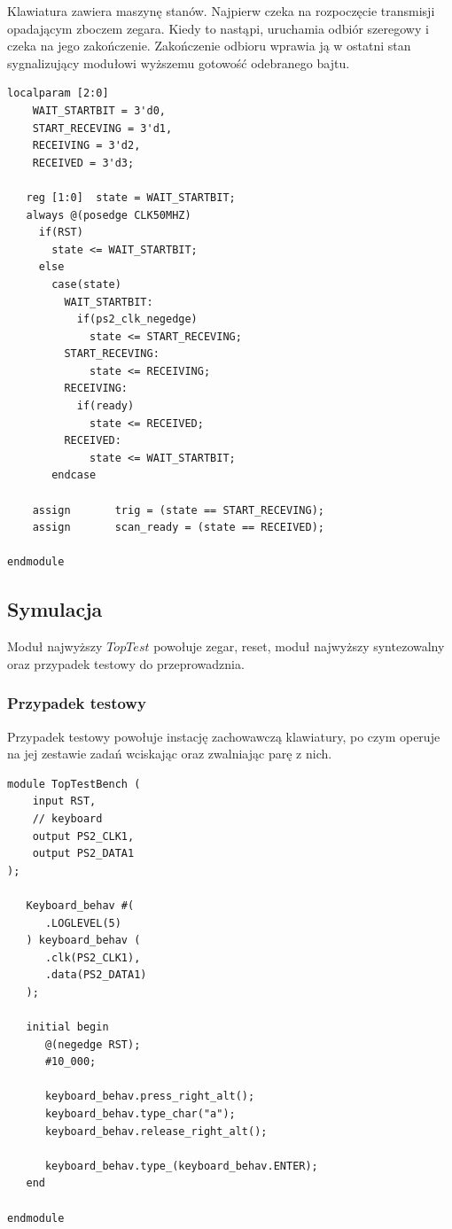\documentclass[a4paper,12pt]{article}
\begin{document}
Klawiatura zawiera maszynę stanów. Najpierw czeka na rozpoczęcie transmisji opadającym zboczem zegara. Kiedy to nastąpi, uruchamia odbiór szeregowy i czeka na jego zakończenie. Zakończenie odbioru wprawia ją w ostatni stan sygnalizujący modułowi wyższemu gotowość odebranego bajtu.
\begin{lstlisting}[label=Keyboard,caption=Keyboard.v,firstnumber=42]
   localparam [2:0]
    WAIT_STARTBIT = 3'd0,
    START_RECEVING = 3'd1,
    RECEIVING = 3'd2,
    RECEIVED = 3'd3;

   reg [1:0]  state = WAIT_STARTBIT;
   always @(posedge CLK50MHZ)
     if(RST)
       state <= WAIT_STARTBIT;
     else
       case(state)
         WAIT_STARTBIT:
           if(ps2_clk_negedge)
             state <= START_RECEVING;
         START_RECEVING:
             state <= RECEIVING;
         RECEIVING:
           if(ready)
             state <= RECEIVED;
         RECEIVED:
             state <= WAIT_STARTBIT;
       endcase

    assign       trig = (state == START_RECEVING);
    assign       scan_ready = (state == RECEIVED);

endmodule
\end{lstlisting}


\subsection{Symulacja}

Moduł najwyższy $TopTest$ powołuje zegar, reset, moduł najwyższy syntezowalny oraz przypadek testowy do przeprowadznia.

\subsubsection{Przypadek testowy}

Przypadek testowy powołuje instację zachowawczą klawiatury, po czym operuje na jej zestawie zadań wciskając oraz zwalniając parę z nich.
\begin{lstlisting}[label=TopTestBench,caption=TopTestBench.v]
module TopTestBench (
    input RST,
    // keyboard
    output PS2_CLK1,
    output PS2_DATA1
);

   Keyboard_behav #(
      .LOGLEVEL(5)
   ) keyboard_behav (
      .clk(PS2_CLK1),
      .data(PS2_DATA1)
   );

   initial begin
      @(negedge RST);
      #10_000;

      keyboard_behav.press_right_alt();
      keyboard_behav.type_char("a");
      keyboard_behav.release_right_alt();

      keyboard_behav.type_(keyboard_behav.ENTER);
   end

endmodule
\end{lstlisting}
\end{document}
